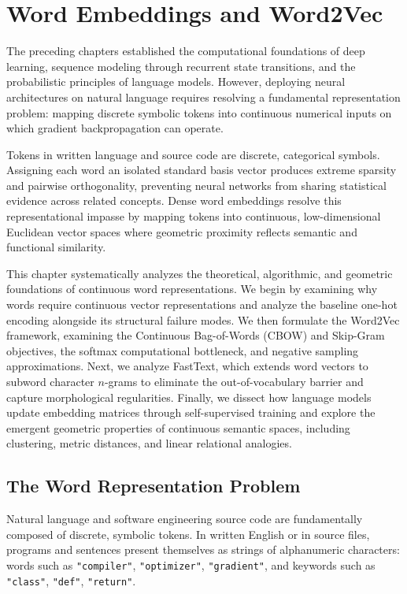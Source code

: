 \documentclass[../../main.tex]{subfiles}
\begin{document}
\chapter{Word Embeddings and Word2Vec}
\label{ch:word_embeddings}

The preceding chapters established the computational foundations of deep learning, sequence modeling through recurrent state transitions, and the probabilistic principles of language models. However, deploying neural architectures on natural language requires resolving a fundamental representation problem: mapping discrete symbolic tokens into continuous numerical inputs on which gradient backpropagation can operate.

Tokens in written language and source code are discrete, categorical symbols. Assigning each word an isolated standard basis vector produces extreme sparsity and pairwise orthogonality, preventing neural networks from sharing statistical evidence across related concepts. Dense word embeddings resolve this representational impasse by mapping tokens into continuous, low-dimensional Euclidean vector spaces where geometric proximity reflects semantic and functional similarity.

This chapter systematically analyzes the theoretical, algorithmic, and geometric foundations of continuous word representations. We begin by examining why words require continuous vector representations and analyze the baseline one-hot encoding alongside its structural failure modes. We then formulate the Word2Vec framework, examining the Continuous Bag-of-Words (CBOW) and Skip-Gram objectives, the softmax computational bottleneck, and negative sampling approximations. Next, we analyze FastText, which extends word vectors to subword character $n$-grams to eliminate the out-of-vocabulary barrier and capture morphological regularities. Finally, we dissect how language models update embedding matrices through self-supervised training and explore the emergent geometric properties of continuous semantic spaces, including clustering, metric distances, and linear relational analogies.

\clearpage
\section{The Word Representation Problem}
\label{sec:representation_problem}

Natural language and software engineering source code are fundamentally composed of discrete, symbolic tokens. In written English or in source files, programs and sentences present themselves as strings of alphanumeric characters: words such as \texttt{"compiler"}, \texttt{"optimizer"}, \texttt{"gradient"}, and keywords such as \texttt{"class"}, \texttt{"def"}, \texttt{"return"}.
\end{document}
